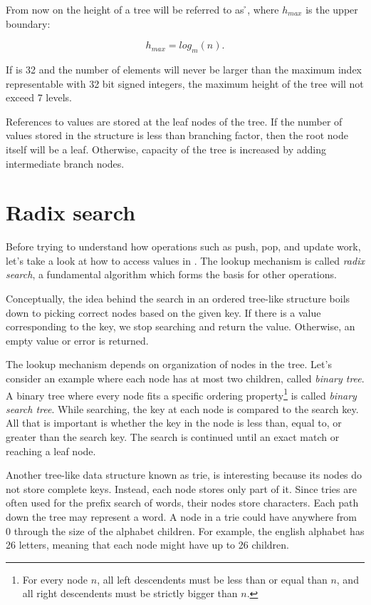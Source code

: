 From now on the height of a tree will be referred to as \h{}, where $h_{max}$ is the upper boundary:

\begin{equation}
    h_{max} = log_m(n).
\end{equation}

If \m{} is 32 and the number of elements will never be larger than the maximum index representable with 32 bit signed integers, the maximum height of the tree will not exceed 7 levels.

References to values are stored at the leaf nodes of the tree. If the number of values stored in the structure is less than branching factor, then the root node itself will be a leaf. Otherwise, capacity of the tree is increased by adding intermediate branch nodes.

\section{Radix search}
\label{sec:rb-tree-radix-search}

Before trying to understand how operations such as push, pop, and update work, let's take a look at how to access values in \rbtree{}. The lookup mechanism is called \emph{radix search}, a fundamental algorithm which forms the basis for other operations.

Conceptually, the idea behind the search in an ordered tree-like structure boils down to picking correct nodes based on the given key. If there is a value corresponding to the key, we stop searching and return the value. Otherwise, an empty value or error is returned.

The lookup mechanism depends on organization of nodes in the tree. Let's consider an example where each node has at most two children, called \emph{binary tree}. A binary tree where every node fits a specific ordering property\footnote{For every node $n$, all left descendents must be less than or equal than $n$, and all right descendents must be strictly bigger than $n$.} is called \emph{binary search tree}. While searching, the key at each node is compared to the search key. All that is important is whether the key in the node is less than, equal to, or greater than the search key. The search is continued until an exact match or reaching a leaf node.

Another tree-like data structure known as trie, is interesting because its nodes do not store complete keys. Instead, each node stores only part of it. Since tries are often used for the prefix search of words, their nodes store characters. Each path down the tree may represent a word. A node in a trie could have anywhere from 0 through the size of the alphabet children. For example, the english alphabet has 26 letters, meaning that each node might have up to 26 children.

